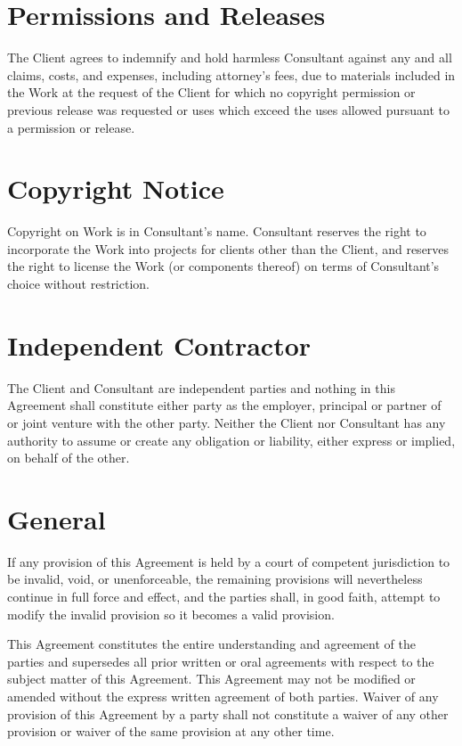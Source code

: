 \documentclass[10pt]{article}
\begin{document}
\section{Permissions and Releases}

The Client agrees to indemnify and hold harmless Consultant against any and
all claims, costs, and expenses, including attorney's fees, due to materials
included in the Work at the request of the Client for which no copyright
permission or previous release was requested or uses which exceed the uses
allowed pursuant to a permission or release.  


\section{Copyright Notice}

Copyright on Work is in Consultant's name.  Consultant reserves the right to incorporate the Work into projects for clients other than the Client, and reserves the right to license the Work (or components thereof) on terms of Consultant's choice without restriction.


\section{Independent Contractor}

The Client and Consultant are independent parties and nothing in this
Agreement shall constitute either party as the employer, principal or
partner of or joint venture with the other party.  Neither the Client nor
Consultant has any authority to assume or create any obligation or
liability, either express or implied, on behalf of the other.

\section{General}

If any provision of this Agreement is held by a court of competent
jurisdiction to be invalid, void, or unenforceable, the remaining provisions
will nevertheless continue in full force and effect, and the parties shall,
in good faith, attempt to modify the invalid provision so it becomes a valid
provision.

This Agreement constitutes the entire understanding and agreement of the
parties and supersedes all prior written or oral agreements with respect to
the subject matter of this Agreement. This Agreement may not be modified or
amended without the express written agreement of both parties. Waiver of any
provision of this Agreement by a party shall not constitute a waiver of any
other provision or waiver of the same provision at any other time.
\end{document}
